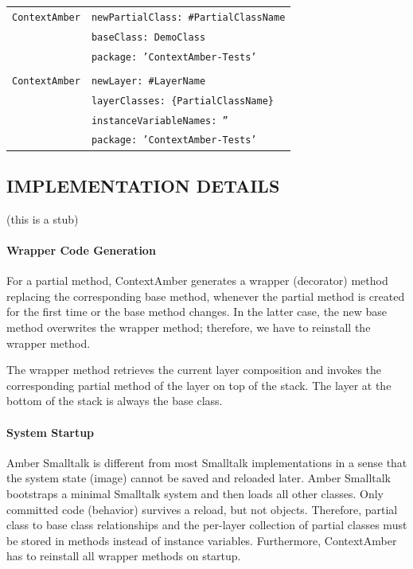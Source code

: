 \documentclass[english,paper=a4,twocolumn=true,DIV=calc,fontsize=9pt]{scrartcl}
\begin{document}
\begin{table}[h]
    \begin{tabular}{ll}
        \texttt{ContextAmber} & \texttt{newPartialClass: \#PartialClassName} \\
         & \texttt{baseClass: DemoClass} \\
         & \texttt{package: 'ContextAmber-Tests'} \\
       \\
        \texttt{ContextAmber} & \texttt{newLayer: \#LayerName} \\
        & \texttt{layerClasses: \{PartialClassName\}} \\
        & \texttt{instanceVariableNames: ''} \\
        & \texttt{package: 'ContextAmber-Tests'} 
    \end{tabular}
\end{table}

\subsection{IMPLEMENTATION DETAILS}
(this is a stub)

\paragraph{Wrapper Code Generation}
For a partial method, ContextAmber generates a wrapper (decorator) method replacing the corresponding base method, whenever the partial method is created for the first time or the base method changes. In the latter case, the new base method overwrites the wrapper method; therefore, we have to reinstall the wrapper method.

The wrapper method retrieves the current layer composition and invokes the corresponding partial method of the layer on top of the stack. The layer at the bottom of the stack is always the base class.

\paragraph{System Startup}
Amber Smalltalk is different from most Smalltalk implementations in a sense that the system state (image) cannot be saved and reloaded later. Amber Smalltalk bootstraps a minimal Smalltalk system and then loads all other classes. Only committed code (behavior) survives a reload, but not objects. Therefore, partial class to base class relationships and the per-layer collection of partial classes must be stored in methods instead of instance variables. Furthermore, ContextAmber has to reinstall all wrapper methods on startup.
\end{document}
